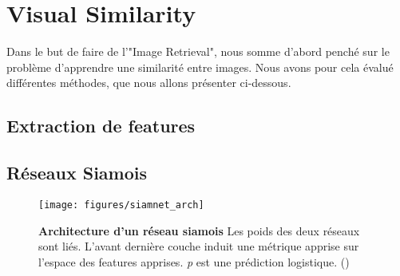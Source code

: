 \section{Visual Similarity}

Dans le but de faire de l'"Image Retrieval", nous somme d'abord pench\'e sur le probl\`eme d'apprendre une similarit\'e
entre images. Nous avons pour cela \'evalu\'e diff\'erentes m\'ethodes, que nous allons pr\'esenter ci-dessous.

\subsection{Extraction de features}

\subsection{R\'eseaux Siamois}
 
\begin{figure}[ht]
 \center
 \texttt{[image: figures/siamnet\_arch]}
 \caption{\label{siamnet_arch} \textbf{Architecture d'un r\'eseau siamois} Les poids des deux r\'eseaux sont li\'es. L'avant derni\`ere
 couche induit une m\'etrique apprise sur l'espace des features apprises. \textit{p} est une pr\'ediction logistique.
 (\protect\cite{koch2015siamese})}
\end{figure}
